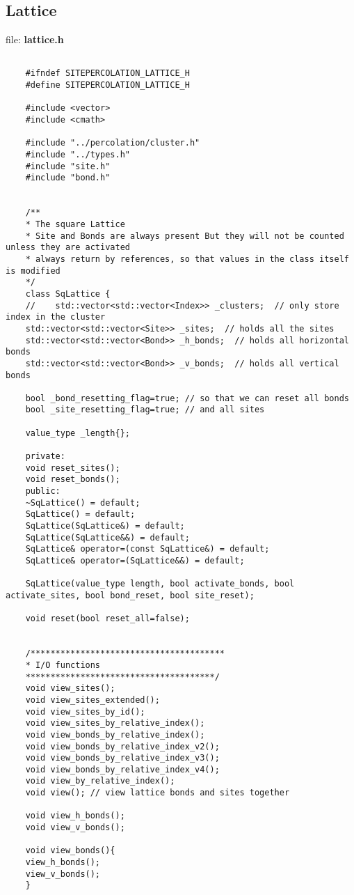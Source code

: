 	\subsection{Lattice}
	file: \textbf{lattice.h}
	\begin{lstlisting}[style=CStyle]
	
	#ifndef SITEPERCOLATION_LATTICE_H
	#define SITEPERCOLATION_LATTICE_H
	
	#include <vector>
	#include <cmath>
	
	#include "../percolation/cluster.h"
	#include "../types.h"
	#include "site.h"
	#include "bond.h"
	
	
	/**
	* The square Lattice
	* Site and Bonds are always present But they will not be counted unless they are activated
	* always return by references, so that values in the class itself is modified
	*/
	class SqLattice {
	//    std::vector<std::vector<Index>> _clusters;  // only store index in the cluster
	std::vector<std::vector<Site>> _sites;  // holds all the sites
	std::vector<std::vector<Bond>> _h_bonds;  // holds all horizontal bonds
	std::vector<std::vector<Bond>> _v_bonds;  // holds all vertical bonds
	
	bool _bond_resetting_flag=true; // so that we can reset all bonds
	bool _site_resetting_flag=true; // and all sites
	
	value_type _length{};
	
	private:
	void reset_sites();
	void reset_bonds();
	public:
	~SqLattice() = default;
	SqLattice() = default;
	SqLattice(SqLattice&) = default;
	SqLattice(SqLattice&&) = default;
	SqLattice& operator=(const SqLattice&) = default;
	SqLattice& operator=(SqLattice&&) = default;
	
	SqLattice(value_type length, bool activate_bonds, bool activate_sites, bool bond_reset, bool site_reset);
	
	void reset(bool reset_all=false);
	
	
	/***************************************
	* I/O functions
	**************************************/
	void view_sites();
	void view_sites_extended();
	void view_sites_by_id();
	void view_sites_by_relative_index();
	void view_bonds_by_relative_index();
	void view_bonds_by_relative_index_v2();
	void view_bonds_by_relative_index_v3();
	void view_bonds_by_relative_index_v4();
	void view_by_relative_index();
	void view(); // view lattice bonds and sites together
	
	void view_h_bonds();
	void view_v_bonds();
	
	void view_bonds(){
	view_h_bonds();
	view_v_bonds();
	}
	

\end{lstlisting}
